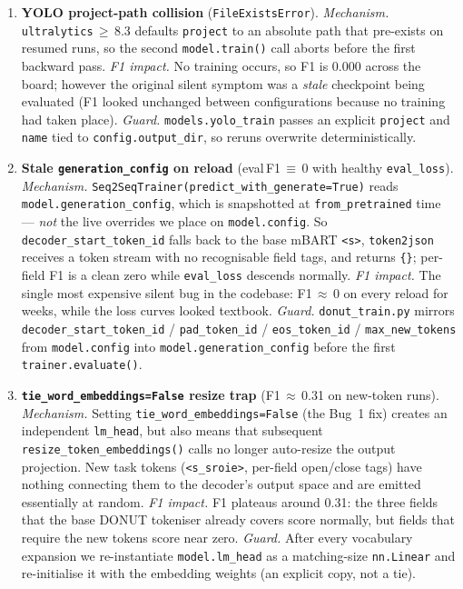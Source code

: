 \documentclass[conference]{IEEEtran}
\begin{document}
\begin{enumerate}
\item \textbf{YOLO project-path collision} (\texttt{FileExistsError}).
  \textit{Mechanism.} \texttt{ultralytics}\,$\geq$\,8.3 defaults
  \texttt{project} to an absolute path that pre-exists on resumed
  runs, so the second \texttt{model.train()} call aborts before the
  first backward pass.  \textit{F1 impact.} No training occurs, so
  F1 is 0.000 across the board; however the original silent symptom
  was a \emph{stale} checkpoint being evaluated (F1 looked
  unchanged between configurations because no training had taken
  place).  \textit{Guard.} \texttt{models.yolo\_train} passes an
  explicit \texttt{project} and \texttt{name} tied to
  \texttt{config.output\_dir}, so reruns overwrite deterministically.

\item \textbf{Stale \texttt{generation\_config} on reload}
  (eval\,F1\,$\equiv$\,0 with healthy \texttt{eval\_loss}).
  \textit{Mechanism.} \texttt{Seq2SeqTrainer(predict\_with\_generate=True)}
  reads \texttt{model.generation\_config}, which is snapshotted at
  \texttt{from\_pretrained} time --- \emph{not} the live overrides
  we place on \texttt{model.config}.  So
  \texttt{decoder\_start\_token\_id} falls back to the base mBART
  \texttt{<s>}, \texttt{token2json} receives a token stream with no
  recognisable field tags, and returns \texttt{\{\}}; per-field F1
  is a clean zero while \texttt{eval\_loss} descends normally.
  \textit{F1 impact.} The single most expensive silent bug in the
  codebase: F1\,$\approx$\,0 on every reload for weeks, while the
  loss curves looked textbook.  \textit{Guard.}
  \texttt{donut\_train.py} mirrors
  \texttt{decoder\_start\_token\_id} / \texttt{pad\_token\_id} /
  \texttt{eos\_token\_id} / \texttt{max\_new\_tokens} from
  \texttt{model.config} into \texttt{model.generation\_config}
  before the first \texttt{trainer.evaluate()}.

\item \textbf{\texttt{tie\_word\_embeddings=False} resize trap}
  (F1\,$\approx$\,0.31 on new-token runs).
  \textit{Mechanism.} Setting \texttt{tie\_word\_embeddings=False}
  (the Bug~1 fix) creates an independent \texttt{lm\_head}, but also
  means that subsequent \texttt{resize\_token\_embeddings()} calls
  no longer auto-resize the output projection.  New task tokens
  (\texttt{<s\_sroie>}, per-field open/close tags) have nothing
  connecting them to the decoder's output space and are emitted
  essentially at random.  \textit{F1 impact.} F1 plateaus around
  0.31: the three fields that the base DONUT tokeniser already
  covers score normally, but fields that require the new tokens
  score near zero.  \textit{Guard.} After every vocabulary expansion
  we re-instantiate \texttt{model.lm\_head} as a matching-size
  \texttt{nn.Linear} and re-initialise it with the embedding weights
  (an explicit copy, not a tie).


\end{enumerate}
\end{document}
